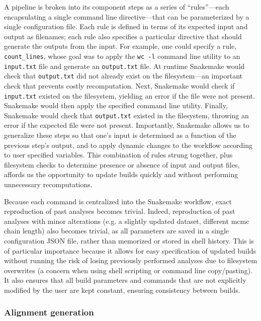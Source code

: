 A pipeline is broken into its component steps as a series of ``rules''---each encapsulating a single command line directive---that can be parameterized by a single configuration file.
Each rule is defined in terms of its expected input and output as filenames; each rule also specifies a particular directive that should generate the outputs from the input.
For example, one could specify a rule, \texttt{count\_lines}, whose goal was to apply the \texttt{wc -l} command line utility to an \texttt{input.txt} file and generate an \texttt{output.txt} file.
At runtime Snakemake would check that \texttt{output.txt} did not already exist on the filesystem---an important check that prevents costly recomputation.
Next, Snakemake would check if \texttt{input.txt} existed on the filesystem, yielding an error if the file were not present.
Snakemake would then apply the specified command line utility.
Finally, Snakemake would check that \texttt{output.txt} existed in the filesystem, throwing an error if the expected file were not present.
Importantly, Snakemake allows us to generalize these steps so that one's input is determined as a function of the previous step's output, and to apply dynamic changes to the workflow according to user specified variables.
This combination of rules strung together, plus filesystem checks to determine presence or absence of input and output files, affords us the opportunity to update builds quickly and without performing unnecessary recomputations.

Because each command is centralized into the Snakemake workflow, exact reproduction of past analyses becomes trivial.
Indeed, reproduction of past analyses with minor alterations (e.g. a slightly updated dataset, different \gls{mcmc} chain length) also becomes trivial, as all parameters are saved in a single configuration JSON file, rather than memorized or stored in shell history.
This is of particular importance because it allows for easy specification of updated builds without running the risk of losing previously performed analyses due to filesystem overwrites (a concern when using shell scripting or command line copy/pasting).
It also ensures that all build parameters and commands that are not explicitly modified by the user are kept constant, ensuring consistency between builds.

\subsubsection{Alignment generation}

